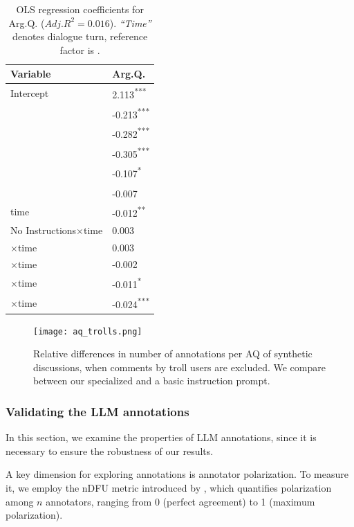 \begin{table}
	\centering
	\begin{tabular}{l p{2.5cm}}
		\toprule
		\textbf{Variable} & \textbf{Arg.Q.} \\
		\midrule
		Intercept & 2.113\textsuperscript{***} \\
		\strategynoinstr & -0.213\textsuperscript{***} \\
		\strategymodgame & -0.282\textsuperscript{***} \\
		\strategyrules & -0.305\textsuperscript{***} \\
		\strategyregroom & -0.107\textsuperscript{*} \\
		\strategyconstrcomm & -0.007\textsuperscript{} \\
		time & -0.012\textsuperscript{**} \\
		No Instructions$\times$time & 0.003 \\
		\strategymodgame$\times$time & 0.003 \\
		\strategyrules$\times$time & -0.002 \\
		\strategyregroom$\times$time & -0.011\textsuperscript{*} \\
		\strategyconstrcomm$\times$time & -0.024\textsuperscript{***} \\
		\bottomrule
	\end{tabular}
	\small
	\asterisknote
	\normalsize
	\caption{\ac{OLS} regression coefficients for Arg.Q. ($Adj.R^2=0.016$). \textit{“Time”} denotes dialogue turn, reference factor is \emph{\strategynomod}.}
	\label{tab:argq}
\end{table}


\begin{figure}
	\centering
	\texttt{[image: aq\_trolls.png]}
	\caption{Relative differences in number of annotations per \ac{AQ} of synthetic discussions, when comments by troll users are excluded. We compare between our specialized and a basic instruction prompt.}
	\label{fig:aq_trolls}
\end{figure}


\subsubsection{Validating the LLM annotations}

In this section, we examine the properties of \ac{LLM} annotations, since it is necessary to ensure the robustness of our results.

A key dimension for exploring annotations is annotator polarization. To measure it, we employ the \ac{nDFU} metric introduced by \citet{pavlopoulos-likas-2024-polarized}, which quantifies polarization among $n$ annotators, ranging from 0 (perfect agreement) to 1 (maximum polarization).

